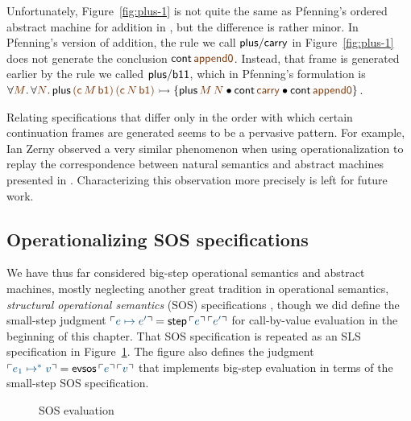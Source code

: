 Unfortunately, Figure~\ref{fig:plus-1} is not quite the same as Pfenning's 
ordered abstract machine for addition in \cite{pfenning12ordered}, but the
difference is rather minor. In Pfenning's version of addition, the rule
we call ${\sf plus/carry}$ in Figure~\ref{fig:plus-1} does not generate
the conclusion ${\sf cont}\,\lf{\sf append0}$. Instead, that frame 
is generated earlier by the rule we called
${\sf plus/b11}$, which in Pfenning's formulation is
$\forall\lf{M}.\,\forall\lf{N}.\,
  {\sf plus}\,\lf{({\sf c}\,M\,{\sf b1})}\,\lf{({\sf c}\,N\,{\sf b1})}
  \lefti
  \{
    {\sf plus}\,\lf{M}\,\lf{N}
    \fuse
    {\sf cont}\,\lf{\sf carry}
    \fuse
    {\sf cont}\,\lf{\sf append0}
  \}$. 
%

Relating 
%
specifications that differ only in the order with which certain
continuation frames are generated seems to be a pervasive pattern. For
example, Ian Zerny observed a very similar phenomenon when using
operationalization to replay the correspondence between natural
semantics and abstract machines presented in
\cite{danvy12interderiving}. Characterizing this observation more
precisely is left for future work.



\subsection{Operationalizing SOS specifications}
\label{sec:evaluationcontexts}


We have thus far considered big-step operational semantics and
abstract machines, mostly neglecting another great tradition in
operational semantics, {\it structural operational semantics} (SOS)
specifications \cite{plotkin04structural}, though we did define the
small-step judgment $\interp{e \mapsto e'} = {\sf
  step}\,\interp{e}\,\interp{e'}$ for call-by-value evaluation in the
beginning of this chapter.  That SOS specification is repeated as an
SLS specification in Figure~\ref{fig:cbv-sos-b}. The figure also
defines the judgment $\interp{e_1 \mapsto^* v} = {\sf
  evsos}\,\interp{e}\,\interp{v}$ that implements big-step evaluation
in terms of the small-step SOS specification.

\begin{figure}[tp]
\begin{minipage}[b]{0.9\linewidth}
\end{minipage}
\caption{SOS evaluation}
\label{fig:cbv-sos-b}
\end{figure}


